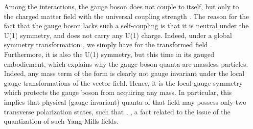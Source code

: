 \documentclass[a4paper,11pt]{article}
\begin{document}
Among the interactions, the gauge boson \coordHE{} does not couple to itself,
but only to the charged matter field with the universal coupling strength \coordHE{}.
The reason for the fact that the gauge boson lacks such a self-coupling 
is that it is neutral under the U(1) symmetry, and does not carry any 
U(1) charge. Indeed, under a global symmetry transformation 
\coordHE{}, we simply have for the transformed field \coordHE{}. 
Furthermore, it is also the U(1) symmetry, but this time in its gauged 
embodiement, which explains why the gauge boson quanta are massless 
particles. Indeed, any mass term of the form \coordHE{} is clearly 
not gauge invariant under the local gauge transformations of the vector 
field. Hence, it is the local gauge symmetry which protects the gauge 
boson from acquiring any mass. In particular, this implies that physical 
(gauge invariant) quanta of that field may possess only two transverse 
polarization states, such that \coordHE{}, 
\myHighlight{$\lambda=\pm$}\coordHE{}, a fact related to the issue of the quantization of such 
Yang-Mills fields.
\end{document}
